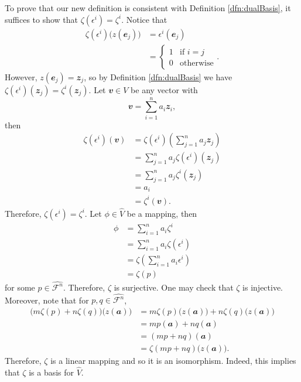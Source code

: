 \documentclass[math, code]{amznotes}
\theoremstyle{remark}
\begin{document}
To prove that our new definition is consistent with Definition \ref{dfn:dualBasis}, it suffices to show that $\zeta(\epsilon^i) = \zeta^i$. Notice that
\begin{align*}
    \zeta(\epsilon^i)\bigl(z(\mathbfit{e}_j)\bigr) & = \epsilon^i(\mathbfit{e}_j) \\
    & = \begin{cases}
        1 & \textrm{if } i = j \\
        0 & \textrm{otherwise}
    \end{cases}.
\end{align*}
However, $z(\mathbfit{e}_j) = \mathbfit{z}_j$, so by Definition \ref{dfn:dualBasis} we have $\zeta(\epsilon^i)(\mathbfit{z}_j) = \zeta^i(\mathbfit{z}_j)$. Let $\mathbfit{v} \in V$ be any vector with
\begin{equation*}
    \mathbfit{v} = \sum_{i = 1}^{n}a_i\mathbfit{z}_i,
\end{equation*}
then 
\begin{align*}
    \zeta(\epsilon^i)(\mathbfit{v}) & = \zeta(\epsilon^i)\left(\sum_{j = 1}^{n}a_j\mathbfit{z}_j\right) \\
    & = \sum_{j = 1}^{n}a_j\zeta(\epsilon^i)(\mathbfit{z}_j) \\
    & = \sum_{j = 1}^{n}a_j\zeta^i(\mathbfit{z}_j) \\
    & = a_i \\
    & = \zeta^i(\mathbfit{v}).
\end{align*}
Therefore, $\zeta(\epsilon^i) = \zeta^i$. Let $\phi \in \hat{V}$ be a mapping, then
\begin{align*}
    \phi & = \sum_{i = 1}^{n}a_i\zeta^i \\
    & = \sum_{i = 1}^{n}a_i\zeta(\epsilon^i) \\
    & = \zeta\left(\sum_{i = 1}^{n}a_i\epsilon^i\right) \\
    & = \zeta(p)
\end{align*}
for some $p \in \hat{\mathcal{F}^n}$. Therefore, $\zeta$ is surjective. One may check that $\zeta$ is injective. Moreover, note that for $p, q \in \hat{\mathcal{F}^n}$,
\begin{align*}
    \bigl(m\zeta(p) + n\zeta(q)\bigr)\bigl(z(\mathbfit{a})\bigr) & = m\zeta(p)\bigl(z(\mathbfit{a})\bigr) + n\zeta(q)\bigl(z(\mathbfit{a})\bigr) \\
    & = mp(\mathbfit{a}) + nq(\mathbfit{a}) \\
    & = (mp + nq)(\mathbfit{a}) \\
    & = \zeta(mp + nq)\bigl(z(\mathbfit{a})\bigr).
\end{align*}
Therefore, $\zeta$ is a linear mapping and so it is an isomorphism. Indeed, this implies that $\zeta$ is a basis for $\hat{V}$.
\end{document}

